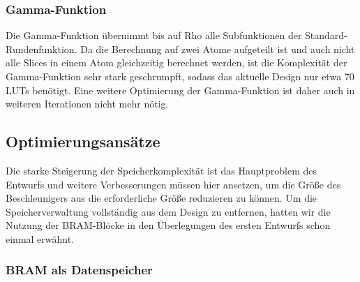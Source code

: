 \subsubsection{Gamma-Funktion}
Die Gamma-Funktion übernimmt bis auf Rho alle Subfunktionen der Standard-Rundenfunktion. Da die Berechnung auf zwei Atome aufgeteilt ist und auch nicht alle Slices in einem Atom gleichzeitig berechnet werden,
ist die Komplexität der Gamma-Funktion sehr stark geschrumpft, sodass das aktuelle Design nur etwa 70 LUTs benötigt. Eine weitere Optimierung der Gamma-Funktion ist daher auch in weiteren Iterationen nicht mehr nötig.

\subsection{Optimierungsansätze}
Die starke Steigerung der Speicherkomplexität ist das Hauptproblem des Entwurfs und weitere Verbesserungen müssen hier ansetzen, um die Größe des Beschleunigers aus die erforderliche Größe reduzieren zu können.
Um die Speicherverwaltung vollständig aus dem Design zu entfernen, hatten wir die Nutzung der BRAM-Blöcke in den Überlegungen des ersten Entwurfs schon einmal erwähnt.

\subsubsection{}

\subsubsection{BRAM als Datenspeicher}
